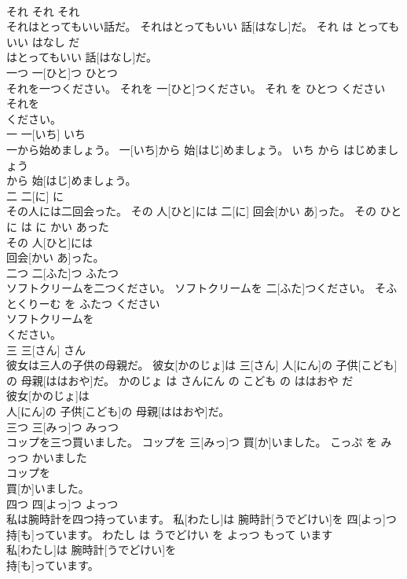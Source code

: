 \documentclass[8pt]{extreport}
\begin{document}
\begin{CJK}{UTF8}{min}
\\	それ	それ	それ	
\\	それはとってもいい話だ。	それはとってもいい 話[はなし]だ。	それ は とっても いい はなし だ	
\\	はとってもいい 話[はなし]だ。		
\\	一つ	一[ひと]つ	ひとつ	
\\	それを一つください。	それを 一[ひと]つください。	それ を ひとつ ください	
\\	それを
\\	ください。		
\\	一	一[いち]	いち	
\\	一から始めましょう。	一[いち]から 始[はじ]めましょう。	いち から はじめましょう	
\\	から 始[はじ]めましょう。		
\\	二	二[に]	に	
\\	その人には二回会った。	その 人[ひと]には 二[に] 回会[かい あ]った。	その ひと に は に かい あった	
\\	その 人[ひと]には
\\	回会[かい あ]った。		
\\	二つ	二[ふた]つ	ふたつ	
\\	ソフトクリームを二つください。	ソフトクリームを 二[ふた]つください。	そふとくりーむ を ふたつ ください	
\\	ソフトクリームを
\\	ください。		
\\	三	三[さん]	さん	
\\	彼女は三人の子供の母親だ。	彼女[かのじょ]は 三[さん] 人[にん]の 子供[こども]の 母親[ははおや]だ。	かのじょ は さんにん の こども の ははおや だ	
\\	彼女[かのじょ]は
\\	人[にん]の 子供[こども]の 母親[ははおや]だ。		
\\	三つ	三[みっ]つ	みっつ	
\\	コップを三つ買いました。	コップを 三[みっ]つ 買[か]いました。	こっぷ を みっつ かいました	
\\	コップを
\\	買[か]いました。		
\\	四つ	四[よっ]つ	よっつ	
\\	私は腕時計を四つ持っています。	私[わたし]は 腕時計[うでどけい]を 四[よっ]つ 持[も]っています。	わたし は うでどけい を よっつ もって います	
\\	私[わたし]は 腕時計[うでどけい]を
\\	持[も]っています。		

\end{CJK}
\end{document}
